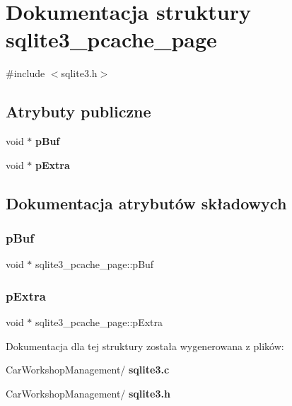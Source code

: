 \section{Dokumentacja struktury sqlite3\+\_\+pcache\+\_\+page}
\label{structsqlite3__pcache__page}


{\ttfamily \#include $<$sqlite3.\+h$>$}

\subsection*{Atrybuty publiczne}
\begin{DoxyCompactItemize}
\item 
void $\ast$ \textbf{ p\+Buf}
\item 
void $\ast$ \textbf{ p\+Extra}
\end{DoxyCompactItemize}


\subsection{Dokumentacja atrybutów składowych}
\mbox{\label{structsqlite3__pcache__page_aa5446325077c05e4b242c8e2d0faba3b}} 
\subsubsection{pBuf}
{\footnotesize\ttfamily void $\ast$ sqlite3\+\_\+pcache\+\_\+page\+::p\+Buf}

\mbox{\label{structsqlite3__pcache__page_a96d7b0314d02837dd6a5e7057912f74f}} 
\subsubsection{pExtra}
{\footnotesize\ttfamily void $\ast$ sqlite3\+\_\+pcache\+\_\+page\+::p\+Extra}



Dokumentacja dla tej struktury została wygenerowana z plików\+:\begin{DoxyCompactItemize}
\item 
Car\+Workshop\+Management/\textbf{ sqlite3.\+c}\item 
Car\+Workshop\+Management/\textbf{ sqlite3.\+h}\end{DoxyCompactItemize}
